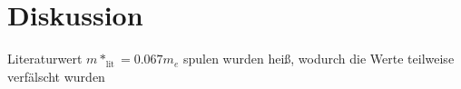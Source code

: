 \section{Diskussion}
\label{sec:Diskussion}



Literaturwert $m*_{\text{lit}}= 0.067 m_e$ \cite{effektiveMasseGaAs}
spulen wurden heiß, wodurch die Werte teilweise verfälscht wurden